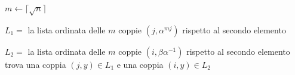 \vspace{1em}
\begin{algorithm}[H]
    \SetAlgoVlined
    \SetAlgoLined
    
    \caption{Shanks($G,n,\alpha,\beta$)}
    \label{alg:shanks}
    

    $m \gets \lceil \sqrt{n} \rceil$\;


    $L_1 =$ la lista ordinata delle $m$ coppie $(j,\alpha^{mj})$ rispetto al secondo elemento\; 


    $L_2 =$ la lista ordinata delle $m$ coppie $(i,\beta\alpha^{-1})$ rispetto al secondo elemento\; 
    trova una coppia $(j,y) \in L_1$ e una coppia $(i,y) \in L_2$\;

     \;
\end{algorithm}
\vspace{2em}
